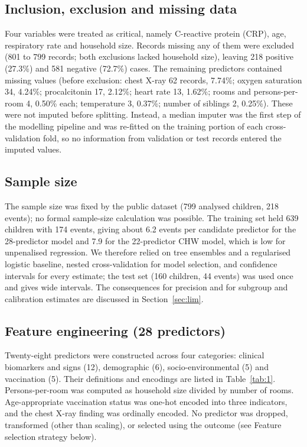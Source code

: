 \documentclass[a4paper,fleqn]{cas-dc}
\begin{document}
\subsection{Inclusion, exclusion and missing data}
\label{sec:incl}

Four variables were treated as critical, namely C-reactive protein (CRP), age, respiratory rate and household size. Records missing any of them were excluded (801 to 799 records; both exclusions lacked household size), leaving 218 positive (27.3\%) and 581 negative (72.7\%) cases. The remaining predictors contained missing values (before exclusion: chest X-ray 62 records, 7.74\%; oxygen saturation 34, 4.24\%; procalcitonin 17, 2.12\%; heart rate 13, 1.62\%; rooms and persons-per-room 4, 0.50\% each; temperature 3, 0.37\%; number of siblings 2, 0.25\%). These were not imputed before splitting. Instead, a median imputer was the first step of the modelling pipeline and was re-fitted on the training portion of each cross-validation fold, so no information from validation or test records entered the imputed values.

\subsection{Sample size}
\label{sec:ss}

The sample size was fixed by the public dataset (799 analysed children, 218 events); no formal sample-size calculation was possible. The training set held 639 children with 174 events, giving about 6.2 events per candidate predictor for the 28-predictor model and 7.9 for the 22-predictor CHW model, which is low for unpenalised regression. We therefore relied on tree ensembles and a regularised logistic baseline, nested cross-validation for model selection, and confidence intervals for every estimate; the test set (160 children, 44 events) was used once and gives wide intervals. The consequences for precision and for subgroup and calibration estimates are discussed in Section~\ref{sec:lim}.

\subsection{Feature engineering (28 predictors)}
\label{sec:feat}

Twenty-eight predictors were constructed across four categories: clinical biomarkers and signs (12), demographic (6), socio-environmental (5) and vaccination (5). Their definitions and encodings are listed in Table~\ref{tab:1}. Persons-per-room was computed as household size divided by number of rooms. Age-appropriate vaccination status was one-hot encoded into three indicators, and the chest X-ray finding was ordinally encoded. No predictor was dropped, transformed (other than scaling), or selected using the outcome (see Feature selection strategy below).
\end{document}
